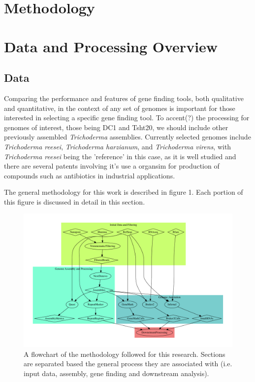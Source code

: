 \section{Methodology}

\section{Data and Processing Overview}

\subsection{Data}

Comparing the performance and features of gene finding tools, both
qualitative and quantitative, in the context of any set of genomes is
important for those interested in selecting a specific gene finding
tool. To accent(?) the processing for genomes of interest, those being
DC1 and Tsht20, we should include other previously assembled
\textit{Trichoderma} assemblies. Currently selected genomes include
\textit{Trichoderma reesei}, \textit{Trichoderma harzianum}, and
\textit{Trichoderma virens}, with \textit{Trichoderma reesei} being
the 'reference' in this case, as it is well studied and there are
several patents involving it's use a organsim for production of
compounds such as antibiotics in industrial applications.

The general methodology for this work is described in figure 1. Each
portion of this figure is discussed in detail in this section.

\begin{figure}
  \includegraphics[width=\textwidth]{./figures/data-flowchart.pdf}
  \caption{A flowchart of the methodology followed for this research. Sections are separated based the general process they are associated with (i.e. input data, assembly, gene finding and downstream analysis).}
\end{figure}

